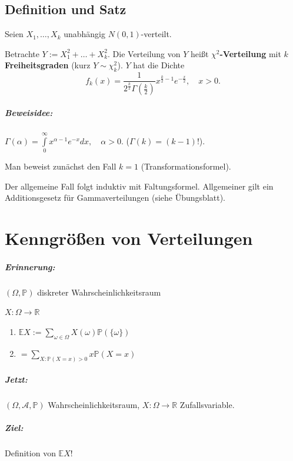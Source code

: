 \documentclass[a4paper,11pt,notitlepage]{report}
\newcommand{\R}{{\ensuremath{\mathbb{R}}}}
\newcommand{\Prim}{{\ensuremath{\mathbb{P}}}}
\newcommand{\E}{{\ensuremath{\mathbb{E}}}}
\begin{document}
\section{Definition und Satz}
Seien $X_1, \ldots, X_k$ unabhängig $N(0,1)$-verteilt.

Betrachte $Y:= X_1^2 + \ldots + X_k^2.$ Die Verteilung von $Y$ heißt
\textbf{$\chi^2$-Verteilung} mit $k$ \textbf{Freiheitsgraden} (kurz $Y \sim \chi^2_k$). $Y$ hat die Dichte
$$f_k(x) = \frac{1}{2^{\frac{k}{2}} \Gamma(\frac{k}{2})} x^{\frac{k}{2}-1} e^{-\frac{x}{2}}, \quad x > 0.$$

\paragraph{Beweisidee:}
$\Gamma(\alpha) = \int\limits_0^{\infty}{x^{\alpha-1} e^{-x} dx}, \quad \alpha > 0.$
($\Gamma(k) = (k-1)!$).

Man beweist zunächst den Fall $k=1$ (Transformationsformel).

Der allgemeine Fall folgt induktiv mit Faltungsformel. Allgemeiner gilt ein Additionsgesetz für Gammaverteilungen (siehe Übungsblatt).

\chapter{Kenngrößen von Verteilungen}

\paragraph{Erinnerung:}
$(\Omega, \Prim)$ diskreter Wahrscheinlichkeitsraum

$X \colon \Omega \rightarrow \R$

\begin{enumerate}
	\item $\E X := \sum\limits_{\omega \in \Omega} X(\omega) \Prim(\{\omega\})$
	\item $= \sum\limits_{X \colon \Prim(X=x) > 0} x \Prim(X=x)$
\end{enumerate}

\paragraph{Jetzt:}
$(\Omega, \mathcal{A}, \Prim)$ Wahrscheinlichkeitsraum, $X \colon \Omega \rightarrow \R$ Zufallsvariable.

\paragraph{Ziel:} Definition von $\E X$!
\end{document}
